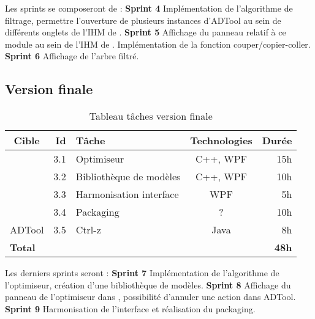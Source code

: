 		Les sprints se composeront de :\newline
		\textbf{Sprint 4} Implémentation de l'algorithme de filtrage, permettre l'ouverture de plusieurs instances d'ADTool au sein de différents onglets de l'IHM de \glasir{}.\newline 
		\textbf{Sprint 5} Affichage du panneau relatif à ce module au sein de l'IHM de \glasir{}. Implémentation de la fonction couper/copier-coller.\newline %
		\textbf{Sprint 6} Affichage de l'arbre filtré.

	\subsection{Version finale}

		\begin{table}[H]
			\centering
			\begin{tabular}{|c|r|l|c|r|}
				\hline
				\textbf{Cible} & \textbf{Id} & \textbf{Tâche} & \textbf{Technologies} & \textbf{Durée}\\
				\hline

				\multirow{4}{*}{\glasir{}} & 3.1 & Optimiseur & C++, WPF & 15h\\
				\cline{2-5}
				 & 3.2 & Bibliothèque de modèles & C++, WPF & 10h\\
				\cline{2-5}
				 & 3.3 & Harmonisation interface & WPF & 5h\\
				\cline{2-5}
				 & 3.4 & Packaging & ? & 10h\\
				\hline

				\multirow{1}{*}{ADTool} & 3.5 & Ctrl-z & \multirow{1}{*}{Java} & 8h\\
				\hline

				\multicolumn{4}{|l|}{\bf Total} & {\bf 48h}\\
				\hline
			\end{tabular}
			\caption{Tableau tâches version finale}
			\label{fig:taches_units_3}
		\end{table}

		Les derniers sprints seront :\newline
		\textbf{Sprint 7} Implémentation de l'algorithme de l'optimiseur, création d'une bibliothèque de modèles.\newline
		\textbf{Sprint 8} Affichage du panneau de l'optimiseur dans \glasir{}, possibilité d'annuler une action dans ADTool.\newline
		\textbf{Sprint 9} Harmonisation de l'interface et réalisation du packaging. \newline